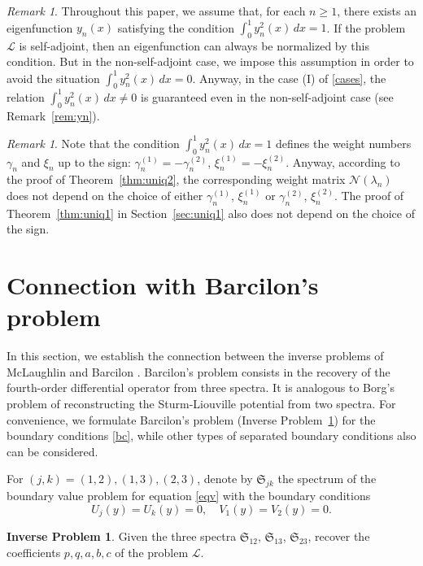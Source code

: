 \documentclass[a4paper,12pt]{article}
\newcommand{\ga}{\gamma}
\newcommand{\la}{\lambda}
\theoremstyle{plain}
\numberwithin{equation}{section}
\theoremstyle{definition}
\newtheorem{ip}[thm]{Inverse Problem}
\theoremstyle{remark}
\newtheorem{remark}[thm]{Remark}
\begin{document}
\begin{remark}
Throughout this paper, we assume that, for each $n \ge 1$, there exists an eigenfunction $y_n(x)$ satisfying the condition $\int_0^1 y_n^2(x) \, dx = 1$. If the problem $\mathcal L$ is self-adjoint, then an eigenfunction can always be normalized by this condition. But in the non-self-adjoint case, we impose this assumption in order to avoid the situation $\int_0^1 y_n^2(x) \, dx = 0$. Anyway, in the case (I) of \eqref{cases}, the relation $\int_0^1 y_n^2(x) \, dx \ne 0$ is guaranteed even in the non-self-adjoint case (see Remark~\ref{rem:yn}).
\end{remark}

\begin{remark}
Note that the condition $\int_0^1 y_n^2(x) \, dx = 1$ defines the weight numbers $\ga_n$ and $\xi_n$ up to the sign: $\ga_n^{(1)} = -\ga_n^{(2)}$, $\xi_n^{(1)} = -\xi_n^{(2)}$. Anyway, according to the proof of Theorem~\ref{thm:uniq2}, the corresponding weight matrix $\mathcal N(\la_n)$ does not depend on the choice of either $\ga_n^{(1)}$, $\xi_n^{(1)}$ or $\ga_n^{(2)}$, $\xi_n^{(2)}$. The proof of Theorem~\ref{thm:uniq1} in Section~\ref{sec:uniq1} also does not depend on the choice of the sign.
\end{remark}

\section{Connection with Barcilon's problem} \label{sec:Bar}

In this section, we establish the connection between the inverse problems of McLaughlin \cite{McL82, McL86} and Barcilon \cite{Bar74-1, Bar74-2}. Barcilon's problem consists in the recovery of the fourth-order differential operator from three spectra. It is analogous to Borg's problem \cite{Borg46} of reconstructing the Sturm-Liouville potential from two spectra.
For convenience, we formulate Barcilon's problem (Inverse Problem~\ref{ip:Bar}) for the boundary conditions \eqref{bc}, while other types of separated boundary conditions also can be considered.

For $(j,k) = (1,2), (1,3), (2,3)$, denote by $\mathfrak S_{jk}$ the spectrum of the boundary value problem for equation \eqref{eqv} with the boundary conditions
\begin{equation} \label{bcBar}
U_j(y) = U_k(y) = 0, \quad V_1(y) = V_2(y) = 0.
\end{equation}

\begin{ip} \label{ip:Bar}
Given the three spectra $\mathfrak S_{12}$, $\mathfrak S_{13}$, $\mathfrak S_{23}$, recover the coefficients $p, q, a, b, c$ of the problem $\mathcal L$.
\end{ip}
\end{document}
